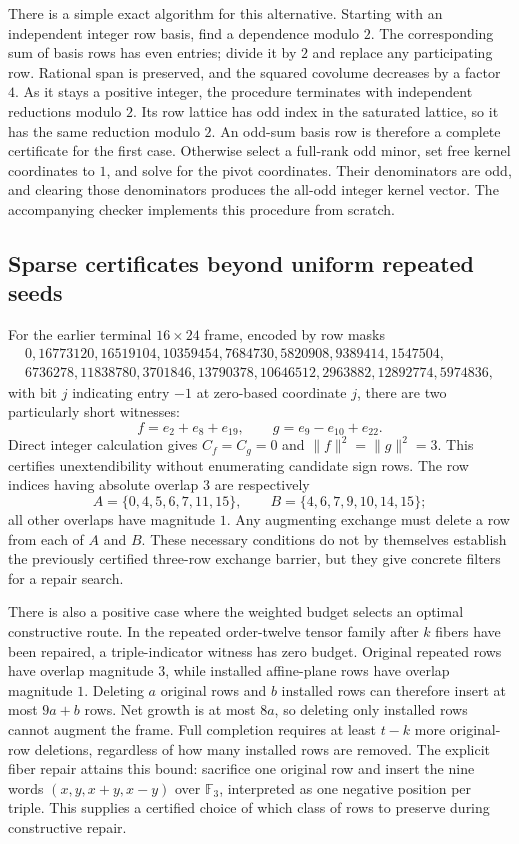 \documentclass[11pt]{article}
\begin{document}
There is a simple exact algorithm for this alternative. Starting with
an independent integer row basis, find a dependence modulo $2$.
The corresponding sum of basis rows has even entries; divide it by
$2$ and replace any participating row. Rational span is preserved,
and the squared covolume decreases by a factor $4$. As it stays a
positive integer, the procedure terminates with independent reductions
modulo $2$. Its row lattice has odd index in the saturated lattice,
so it has the same reduction modulo $2$. An odd-sum basis row is
therefore a complete certificate for the first case. Otherwise select
a full-rank odd minor, set free kernel coordinates to $1$, and solve
for the pivot coordinates. Their denominators are odd, and clearing
those denominators produces the all-odd integer kernel vector.
The accompanying checker implements this procedure from scratch.

\subsection{Sparse certificates beyond uniform repeated seeds}
For the earlier terminal $16\times24$ frame, encoded by row masks
\[
\begin{gathered}
0,16773120,16519104,10359454,7684730,5820908,9389414,1547504,\\
6736278,11838780,3701846,13790378,10646512,2963882,12892774,5974836,
\end{gathered}
\]
with bit $j$ indicating entry $-1$ at zero-based coordinate $j$,
there are two particularly short witnesses:
\[
 f=e_2+e_8+e_{19},\qquad g=e_9-e_{10}+e_{22}.
\]
Direct integer calculation gives $C_f=C_g=0$ and
$\|f\|^2=\|g\|^2=3$. This certifies unextendibility without
enumerating candidate sign rows. The row indices having absolute
overlap $3$ are respectively
\[
 A=\{0,4,5,6,7,11,15\},\qquad
 B=\{4,6,7,9,10,14,15\};
\]
all other overlaps have magnitude $1$. Any augmenting exchange must
delete a row from each of $A$ and $B$. These necessary conditions
do not by themselves establish the previously certified three-row
exchange barrier, but they give concrete filters for a repair search.

There is also a positive case where the weighted budget selects an
optimal constructive route. In the repeated order-twelve tensor
family after $k$ fibers have been repaired, a triple-indicator
witness has zero budget. Original repeated rows have overlap
magnitude $3$, while installed affine-plane rows have overlap
magnitude $1$. Deleting $a$ original rows and $b$ installed rows
can therefore insert at most $9a+b$ rows. Net growth is at most
$8a$, so deleting only installed rows cannot augment the frame.
Full completion requires at least $t-k$ more original-row deletions,
regardless of how many installed rows are removed. The explicit fiber
repair attains this bound: sacrifice one original row and insert the
nine words $(x,y,x+y,x-y)$ over $\mathbb F_3$, interpreted as one
negative position per triple. This supplies a certified choice of
which class of rows to preserve during constructive repair.
\end{document}
